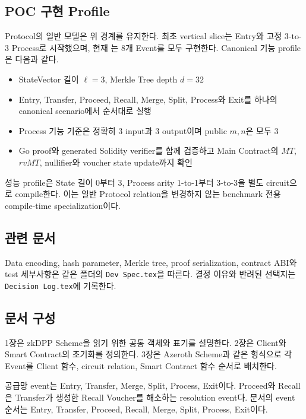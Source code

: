 \documentclass[11pt,a4paper]{extarticle}
\begin{document}
\subsection{POC 구현 Profile}

Protocol의 일반 모델은 위 경계를 유지한다. 최초 vertical slice는 Entry와 고정
3-to-3 Process로 시작했으며, 현재 는 8개 Event를 모두 구현한다.
Canonical 기능 profile은 다음과 같다.

\begin{itemize}
  \item StateVector 길이 $\ell=3$, Merkle Tree depth $d=32$
  \item Entry, Transfer, Proceed, Recall, Merge, Split, Process와 Exit를 하나의
        canonical scenario에서 순서대로 실행
  \item Process 기능 기준은 정확히 3 input과 3 output이며 public $m,n$은 모두 3
  \item Go proof와 generated Solidity verifier를 함께 검증하고 Main Contract의
        $MT$, $rvMT$, nullifier와 voucher state update까지 확인
\end{itemize}

성능 profile은 State 길이 0부터 3, Process arity 1-to-1부터 3-to-3을 별도 circuit으로
compile한다. 이는 일반 Protocol relation을 변경하지 않는 benchmark 전용 compile-time
specialization이다.

\subsection{관련 문서}

Data encoding, hash parameter, Merkle tree, proof serialization, contract ABI와 test
세부사항은 같은 폴더의 \texttt{Dev Spec.tex}을 따른다.
결정 이유와 반려된 선택지는 \texttt{Decision Log.tex}에 기록한다.

\subsection{문서 구성}

1장은 zkDPP Scheme을 읽기 위한 공통 객체와 표기를 설명한다. 2장은 Client와
Smart Contract의 초기화를 정의한다. 3장은 Azeroth Scheme과 같은 형식으로 각
Event를 Client 함수, circuit relation, Smart Contract 함수 순서로 배치한다.

공급망 event는 Entry, Transfer, Merge, Split, Process, Exit이다. Proceed와 Recall은
Transfer가 생성한 Recall Voucher를 해소하는 resolution event다. 문서의 event 순서는
Entry, Transfer, Proceed, Recall, Merge, Split, Process, Exit이다.
\end{document}
